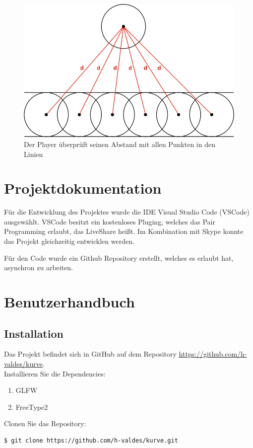 \documentclass[doktyp=studarbeit]{TUBAFarbeiten}
\begin{document}
\begin{figure}[!htb]
    \centering
    \includegraphics[width=0.6\linewidth]{collisions-2.png}
    \caption{Der Player überprüft seinen Abstand mit allen Punkten in den Linien}
    \label{fig:collisions-2}
\end{figure}

\section{Projektdokumentation}

Für die Entwicklung des Projektes wurde die IDE Visual Studio Code (VSCode) 
ausgewählt. VSCode besitzt ein kostenloses Pluging, welches das Pair Programming
erlaubt, das LiveShare heißt. Im Kombination mit Skype konnte das Projekt
gleichzeitig entwicklen werden.

Für den Code wurde ein Github Repository erstellt, welches es erlaubt hat,
asynchron zu arbeiten.

\section{Benutzerhandbuch}

\subsection{Installation}
Das Projekt befindet sich in GitHub auf dem Repository 
\url{https://github.com/h-valdes/kurve}. \\

Installieren Sie die Dependencies:
\begin{enumerate}
    \item GLFW
    \item FreeType2
\end{enumerate}

Clonen Sie das Repository:
\begin{lstlisting}[language=bash]
$ git clone https://github.com/h-valdes/kurve.git
\end{lstlisting}
\end{document}
